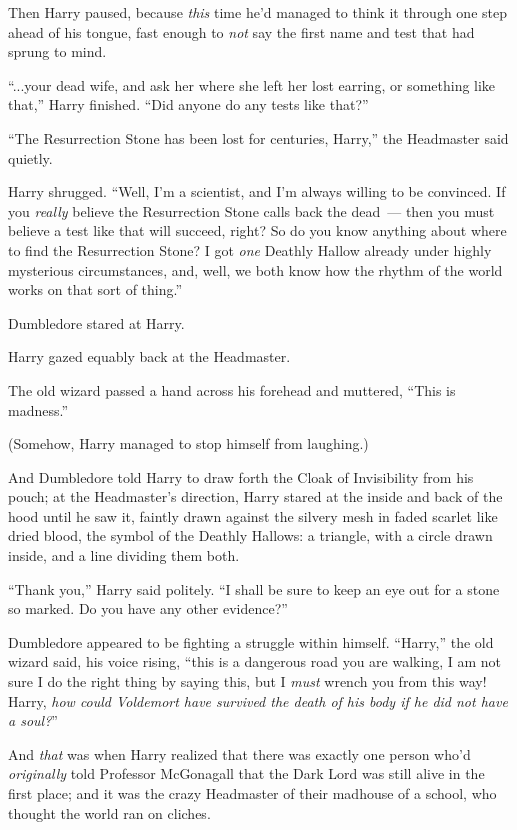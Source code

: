 Then Harry paused, because \emph{this} time he'd managed to think it through one step ahead of his tongue, fast enough to \emph{not} say the first name and test that had sprung to mind.

``...your dead wife, and ask her where she left her lost earring, or something like that,'' Harry finished. ``Did anyone do any tests like that?''

``The Resurrection Stone has been lost for centuries, Harry,'' the Headmaster said quietly.

Harry shrugged. ``Well, I'm a scientist, and I'm always willing to be convinced. If you \emph{really} believe the Resurrection Stone calls back the dead~--- then you must believe a test like that will succeed, right? So do you know anything about where to find the Resurrection Stone? I got \emph{one} Deathly Hallow already under highly mysterious circumstances, and, well, we both know how the rhythm of the world works on that sort of thing.''

Dumbledore stared at Harry.

Harry gazed equably back at the Headmaster.

The old wizard passed a hand across his forehead and muttered, ``This is madness.''

(Somehow, Harry managed to stop himself from laughing.)

And Dumbledore told Harry to draw forth the Cloak of Invisibility from his pouch; at the Headmaster's direction, Harry stared at the inside and back of the hood until he saw it, faintly drawn against the silvery mesh in faded scarlet like dried blood, the symbol of the Deathly Hallows: a triangle, with a circle drawn inside, and a line dividing them both.

``Thank you,'' Harry said politely. ``I shall be sure to keep an eye out for a stone so marked. Do you have any other evidence?''

Dumbledore appeared to be fighting a struggle within himself. ``Harry,'' the old wizard said, his voice rising, ``this is a dangerous road you are walking, I am not sure I do the right thing by saying this, but I \emph{must} wrench you from this way! Harry, \emph{how could Voldemort have survived the death of his body if he did not have a soul?}''

And \emph{that} was when Harry realized that there was exactly one person who'd \emph{originally} told Professor McGonagall that the Dark Lord was still alive in the first place; and it was the crazy Headmaster of their madhouse of a school, who thought the world ran on cliches.

